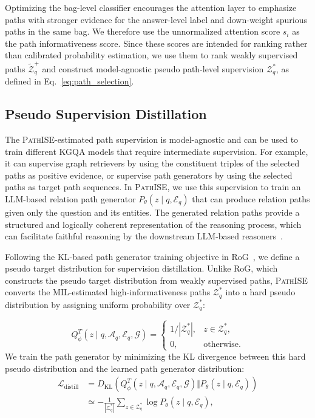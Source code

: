\documentclass{article}
\newcommand{\framework}{\textsc{PathISE}\xspace}
\begin{document}
Optimizing the bag-level classifier encourages the attention layer to emphasize paths with stronger evidence for the answer-level label and down-weight spurious paths in the same bag.
We therefore use the unnormalized attention score $s_i$ as the path informativeness score.
Since these scores are intended for ranking rather than calibrated probability estimation, we use them to rank weakly supervised paths $\widetilde{\mathcal{Z}}_q^{+}$ and construct model-agnostic pseudo path-level supervision $\mathcal{Z}_q^*$, as defined in Eq.~\ref{eq:path_selection}.


\subsection{Pseudo Supervision Distillation}


The \framework{}-estimated path supervision is model-agnostic and can be used to train different KGQA models that require intermediate supervision.
For example, it can supervise graph retrievers by using the constituent triples of the selected paths as positive evidence, or supervise path generators by using the selected paths as target path sequences.
In \framework{}, we use this supervision to train an LLM-based relation path generator $P_\theta(z\mid q,\mathcal{E}_q)$ that can produce relation paths given only the question and its entities. The generated relation paths provide a structured and logically coherent representation of the reasoning process, which can facilitate faithful reasoning by the downstream LLM-based reasoners~\citep{yao_rapl_2025, luo_gcr_2025}.

Following the KL-based path generator training objective in RoG~\citep{luo_rog_2024}, we define a pseudo target distribution for supervision distillation. Unlike RoG, which constructs the pseudo target distribution from weakly supervised paths, \framework{} converts the MIL-estimated high-informativeness paths $\mathcal{Z}_q^*$ into a hard pseudo distribution by assigning uniform probability over $\mathcal{Z}_q^*$:

\begin{equation}
Q_\phi^T(z\mid q,\mathcal{A}_q,\mathcal{E}_q,\mathcal{G})
=
\begin{cases}
1/|\mathcal{Z}_q^*|, & z\in\mathcal{Z}_q^*,\\
0, & \mathrm{otherwise}.
\end{cases}
\end{equation} 
%
We train the path generator by minimizing the KL divergence between this hard pseudo distribution and the learned path generator distribution:
\begin{equation}
\begin{aligned}
\mathcal{L}_{\mathrm{distill}}
&=
D_{\mathrm{KL}}
\left(
Q_\phi^T(z\mid q,\mathcal{A}_q,\mathcal{E}_q,\mathcal{G})
\Vert
P_\theta(z\mid q,\mathcal{E}_q)
\right) \\
&\simeq
-
\frac{1}{|\mathcal{Z}_q^*|}
\sum_{z\in\mathcal{Z}_q^*}
\log P_\theta(z\mid q,\mathcal{E}_q),
\end{aligned}
\end{equation}
\end{document}
